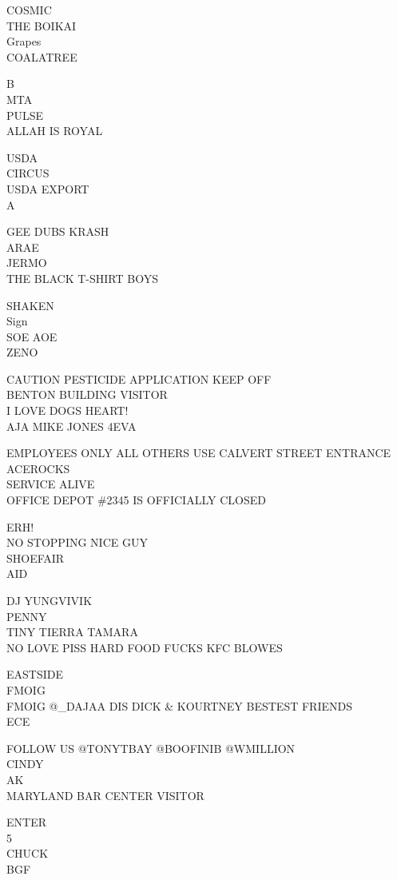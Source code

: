 \documentclass[10pt,letterpaper]{article}
\begin{document}
COSMIC\\
THE BOIKAI\\
Grapes\\
COALATREE

B\\
MTA\\
PULSE\\
ALLAH IS ROYAL

USDA\\
CIRCUS\\
USDA EXPORT\\
A

GEE DUBS KRASH\\
ARAE\\
JERMO\\
THE BLACK T{-}SHIRT BOYS

SHAKEN\\
Sign\\
SOE AOE\\
ZENO

CAUTION PESTICIDE APPLICATION KEEP OFF\\
BENTON BUILDING VISITOR\\
I LOVE DOGS HEART!\\
AJA MIKE JONES 4EVA

EMPLOYEES ONLY ALL OTHERS USE CALVERT STREET ENTRANCE\\
ACEROCKS\\
SERVICE ALIVE\\
OFFICE DEPOT \#2345 IS OFFICIALLY CLOSED

ERH!\\
NO STOPPING NICE GUY\\
SHOEFAIR\\
AID

DJ YUNGVIVIK\\
PENNY\\
TINY TIERRA TAMARA\\
NO LOVE PISS HARD FOOD FUCKS KFC BLOWES

EASTSIDE\\
FMOIG\\
FMOIG @\_DAJAA DIS DICK \& KOURTNEY BESTEST FRIENDS\\
ECE

FOLLOW US @TONYTBAY @BOOFINIB @WMILLION\\
CINDY\\
AK\\
MARYLAND BAR CENTER VISITOR

ENTER\\
5\\
CHUCK\\
BGF
\end{document}
